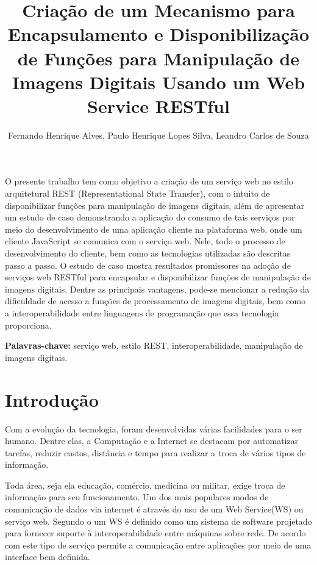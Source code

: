\documentclass[12pt]{article}
\title{Criação de um Mecanismo para Encapsulamento e Disponibilização de Funções para Manipulação de Imagens Digitais Usando um Web Service RESTful}
\author{Fernando Henrique Alves\inst{1}, Paulo Henrique Lopes Silva\inst{1}, Leandro Carlos de Souza\inst{1}}
\begin{document}
 

\maketitle


\begin{resumo} 
  O presente trabalho tem como objetivo a criação de um serviço web no estilo arquitetural REST (Representational State Transfer), com o intuito de disponibilizar funções para manipulação de imagens digitais, além de apresentar um estudo de caso demonstrando a aplicação do consumo de tais serviços por meio do desenvolvimento de uma aplicação cliente na plataforma web, onde um cliente JavaScript se comunica com o serviço web. Nele, todo o processo de desenvolvimento do cliente, bem como as tecnologias utilizadas são descritas passo a passo. O estudo de caso mostra resultados promissores na adoção de serviços web RESTful para encapsular e disponibilizar funções de manipulação de imagens digitais. Dentre as principais vantagens, pode-se mencionar a redução da dificuldade de acesso a funções de processamento de imagens digitais, bem como a interoperabilidade entre linguagens de programação que essa tecnologia proporciona.
  
\end{resumo}
\textbf{Palavras-chave:} serviço web, estilo REST, interoperabilidade, manipulação de imagens digitais.

\section{Introdução}

Com a evolução da tecnologia, foram desenvolvidas várias facilidades para o ser humano. 
Dentre elas, a Computação e a Internet se destacam por automatizar tarefas, reduzir
custos, distância e tempo para realizar a troca de vários tipos de informação. 

Toda área, seja ela educação, comércio, medicina ou militar, exige troca de informação para seu funcionamento. 
Um dos mais populares modos de comunicação de dados via internet é através do uso de um Web Service(WS) ou serviço web.
Segundo o \cite{w3c1} um WS é definido como um sistema de software projetado para fornecer suporte à interoperabilidade entre máquinas sobre rede.
De acordo com  \cite{cerami:02} este tipo
de serviço permite a comunicação entre aplicações por meio de uma interface bem
definida.
\end{document}

